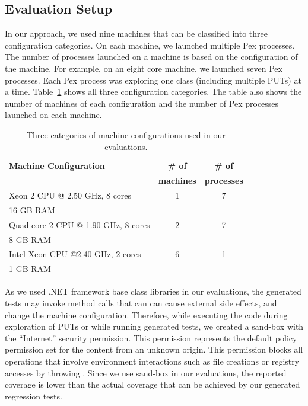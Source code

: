 \subsection{Evaluation Setup}

In our approach, we used nine machines that can be classified into three configuration categories. On each machine, we launched multiple Pex processes. The number of processes launched on a machine is based on the configuration of the machine. For example, on an eight core machine, we launched seven Pex processes. Each Pex process was exploring one class (including multiple PUTs) at a time. Table~\ref{tab:mconfig} shows all three configuration categories. The table also shows the number of machines of each configuration and the number of Pex processes launched on each machine.

\setlength{\tabcolsep}{1pt}
\begin{table}[t]
\begin{SmallOut}
\begin{CodeOut}
\begin{center}
\begin {tabular} {|l|c|c|}
\hline
\textbf{Machine Configuration} & \textbf{\# of} & \textbf{\# of} \\  
 & \textbf{machines} & \textbf{processes}\\  
\hline
\hline  Xeon 2 CPU @ 2.50 GHz, 8 cores & 1 & 7\\
				16 GB RAM & & \\
\hline  Quad core 2 CPU @ 1.90 GHz, 8 cores& 2 & 7\\
				8 GB RAM & & \\
\hline  Intel Xeon CPU @2.40 GHz, 2 cores& 6 & 1\\
				1 GB RAM & & \\
\hline
\end{tabular}
\end{center}
\end{CodeOut}
\end{SmallOut}\vspace*{-4ex}
\centering \caption {\label{tab:mconfig}Three categories of machine configurations used in our evaluations.}
\end{table}

As we used .NET framework base class libraries in our evaluations, the generated tests may invoke method calls that can can cause external side effects, and change the machine configuration. Therefore, while executing the code during exploration of PUTs or while running generated tests, we created a sand-box with the ``Internet'' security permission. This permission represents the default policy permission set for the content from an unknown origin. This permission blocks all operations that involve environment interactions such as file creations or registry accesses by throwing . Since we use sand-box in our evaluations, the reported coverage is lower than the actual coverage that can be achieved by our generated regression tests.

